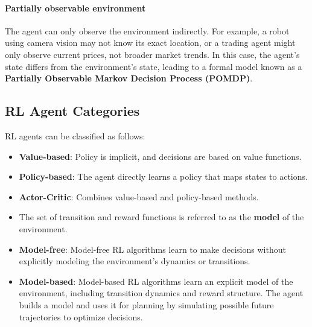 \paragraph{Partially observable environment} The agent can only observe the environment indirectly. For example, a robot using camera vision may not know its exact location, or a trading agent might only observe current prices, not broader market trends. In this case, the agent's state differs from the environment's state, leading to a formal model known as a \textbf{Partially Observable Markov Decision Process (POMDP)}.

\subsection{RL Agent Categories}
RL agents can be classified as follows:
\begin{itemize}
    \item \textbf{Value-based}: Policy is implicit, and decisions are based on value functions.
    \item \textbf{Policy-based}: The agent directly learns a policy that maps states to actions.
    \item \textbf{Actor-Critic}: Combines value-based and policy-based methods.
    \item The set of transition and reward functions is referred to as the \textbf{model} of the environment.
    \item \textbf{Model-free}: Model-free RL algorithms learn to make decisions without explicitly modeling the environment's dynamics or transitions.
    \item \textbf{Model-based}: Model-based RL algorithms learn an explicit model of the environment, including transition dynamics and reward structure. The agent builds a model and uses it for planning by simulating possible future trajectories to optimize decisions.
\end{itemize}

